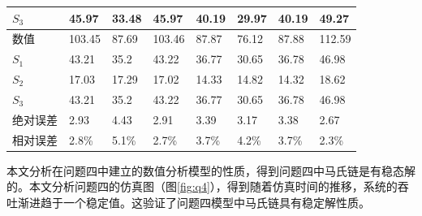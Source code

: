 \documentclass[bwprint]{gmcmthesis}
\begin{document}
\begin{table}[H]
\begin{tabular}{|llllllll|}
\multicolumn{1}{|l|}{$S_3$}    & \multicolumn{1}{l|}{45.97}  & \multicolumn{1}{l|}{33.48} & \multicolumn{1}{l|}{45.97}  & \multicolumn{1}{l|}{40.19} & \multicolumn{1}{l|}{29.97} & \multicolumn{1}{l|}{40.19} & 49.27  \\ \hline
\multicolumn{1}{|l|}{数值}     & \multicolumn{1}{l|}{103.45} & \multicolumn{1}{l|}{87.69} & \multicolumn{1}{l|}{103.46} & \multicolumn{1}{l|}{87.87} & \multicolumn{1}{l|}{76.12} & \multicolumn{1}{l|}{87.88} & 112.59 \\ \hline
\multicolumn{1}{|l|}{$S_1$}    & \multicolumn{1}{l|}{43.21}  & \multicolumn{1}{l|}{35.2}  & \multicolumn{1}{l|}{43.22}  & \multicolumn{1}{l|}{36.77} & \multicolumn{1}{l|}{30.65} & \multicolumn{1}{l|}{36.78} & 46.98  \\ \hline
\multicolumn{1}{|l|}{$S_2$}    & \multicolumn{1}{l|}{17.03}  & \multicolumn{1}{l|}{17.29} & \multicolumn{1}{l|}{17.02}  & \multicolumn{1}{l|}{14.33} & \multicolumn{1}{l|}{14.82} & \multicolumn{1}{l|}{14.32} & 18.62  \\ \hline
\multicolumn{1}{|l|}{$S_3$}    & \multicolumn{1}{l|}{43.21}  & \multicolumn{1}{l|}{35.2}  & \multicolumn{1}{l|}{43.22}  & \multicolumn{1}{l|}{36.77} & \multicolumn{1}{l|}{30.65} & \multicolumn{1}{l|}{36.78} & 46.98  \\ \hline
\multicolumn{1}{|l|}{绝对误差}   & \multicolumn{1}{l|}{2.93}   & \multicolumn{1}{l|}{4.43}  & \multicolumn{1}{l|}{2.91}   & \multicolumn{1}{l|}{3.39}  & \multicolumn{1}{l|}{3.17}  & \multicolumn{1}{l|}{3.38}  & 2.67   \\ \hline
\multicolumn{1}{|l|}{相对误差}   & \multicolumn{1}{l|}{2.8\%}  & \multicolumn{1}{l|}{5.1\%} & \multicolumn{1}{l|}{2.7\%}  & \multicolumn{1}{l|}{3.7\%} & \multicolumn{1}{l|}{4.2\%} & \multicolumn{1}{l|}{3.7\%} & 2.3\%  \\ \hline
\end{tabular}
\label{tab:2}
\end{table}

本文分析在问题四中建立的数值分析模型的性质，得到问题四中马氏链是有稳态解的。本文分析问题四的仿真图（图\ref{fig:q4}），得到随着仿真时间的推移，系统的吞吐渐进趋于一个稳定值。这验证了问题四模型中马氏链具有稳定解性质。
\end{document}
